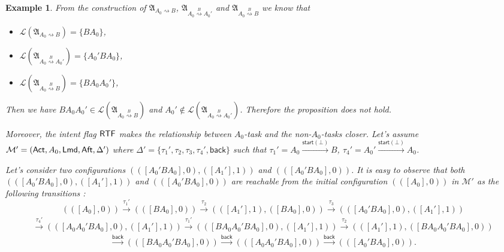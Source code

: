 \documentclass[preprint,12pt]{elsarticle}
\newtheorem{example}{Example}
\newcommand\Mm{{\mathcal{M} }}
\newcommand\act{{\sf Act}}
\newcommand\aft{{\sf Aft}}
\newcommand\lmd{{\sf Lmd}}
\newcommand\rtfflag{{\sf RTF}}
\newcommand\back{{\mathsf{back} }}
\newcommand\startactivity{{\mathsf{start} }}
\newcommand\Aut{{\mathfrak{A} }}
\newcommand\Lang{{\mathscr{L} }}
\begin{document}
{\begin{example}
From the construction of $\Aut_{A_0\rightsquigarrow B}$, $\Aut_{A_0\stackrel{B}\rightsquigarrow A_0'}$ and $\Aut_{A_0\stackrel{B}\rightsquigarrow B}$ we know that 
\begin{itemize}
    \item $\Lang(\Aut_{A_0\rightsquigarrow B}) = \{BA_0\}$, 
    \item $\Lang(\Aut_{A_0\stackrel{B}\rightsquigarrow A_0'}) = \{A_0'BA_0\}$, 
    \item $\Lang(\Aut_{A_0\stackrel{B}\rightsquigarrow B}) = \{BA_0 A_0'\}$, 

\end{itemize}
Then we have $BA_0 A_0' \in \Lang(\Aut_{A_0\stackrel{B}\rightsquigarrow B})$ and $A_0' \notin \Lang(\Aut_{A_0\stackrel{B}\rightsquigarrow A_0'})$. Therefore the proposition does not hold.

Moreover, the intent flag $\rtfflag$ makes the relationship between $A_0$-task and the non-$A_0$-tasks closer. Let's assume $\Mm' = (\act, A_0,\lmd,\aft,\Delta')$ where $\Delta' = \{\tau_1',\tau_2,\tau_3,\tau_4',\back\}$ such that $\tau_1' = A_0\xrightarrow{\startactivity(\bot)}B$, $\tau_4' = A_0'\xrightarrow{\startactivity(\bot)}A_0$.

Let's consider two configurations $(([A_0'BA_0],0),([A_1'],1))$ and $(([A_0'BA_0],0))$. It is easy to observe that both $(([A_0'BA_0],0),([A_1'],1))$ and $(([A_0'BA_0],0))$ are reachable from the initial configuration $(([A_0],0))$ in $\Mm'$ as the following transitions :
$$(([A_0],0)) \xrightarrow[]{\tau_1'}(([BA_0],0)) \xrightarrow[]{\tau_2}(([A_1'],1),([BA_0],0))\xrightarrow[]{\tau_3}(([A_0'BA_0],0),([A_1'],1))$$
$$\xrightarrow[]{\tau_4'}(([A_0A_0'BA_0],0),([A_1'],1)) \xrightarrow[]{\tau_1'}(([BA_0A_0'BA_0],0),([A_1'],1))\xrightarrow[]{\tau_2}(([A_1'],1),([BA_0A_0'BA_0],0))$$
$$ \xrightarrow[]{\back}(([BA_0A_0'BA_0],0))\xrightarrow[]{\back}(([A_0A_0'BA_0],0))\xrightarrow[]{\back}(([A_0'BA_0],0)).$$


\end{example}}
\end{document}
